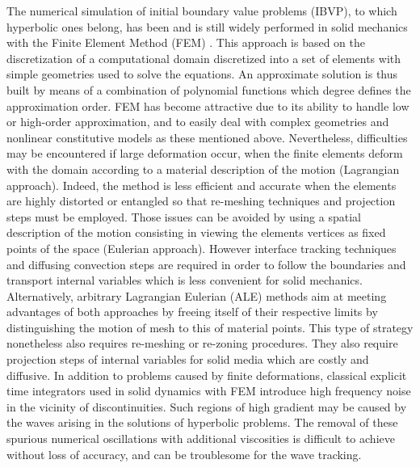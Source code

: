 The numerical simulation of initial boundary value problems (IBVP), to which hyperbolic ones belong, has been and is still widely performed in solid mechanics with the Finite Element Method (FEM) \cite{Belytschko}.
This approach is based on the discretization of a computational domain discretized into a set of elements with simple geometries used to solve the equations.
An approximate solution is thus built by means of a combination of polynomial functions which degree defines the approximation order.
FEM has become attractive due to its ability to handle low or high-order approximation, and to easily deal with complex geometries and nonlinear constitutive models as these mentioned above.  %
Nevertheless, difficulties may be encountered if large deformation occur, when the finite elements deform with the domain according to a material description of the motion (Lagrangian approach).
Indeed, the method is less efficient and accurate when the elements are highly distorted or entangled so that re-meshing techniques and projection steps must be employed.
Those issues can be avoided by using a spatial description of the motion consisting in viewing the elements vertices as fixed points of the space (Eulerian approach).
However interface tracking techniques and diffusing convection steps are required in order to follow the boundaries and transport internal variables which is less convenient for solid mechanics.
Alternatively, arbitrary Lagrangian Eulerian (ALE) methods aim at meeting advantages of both approaches by freeing itself of their respective limits by distinguishing the motion of mesh to this of material points.
This type of strategy nonetheless also requires re-meshing or re-zoning procedures. %
They also require projection steps of internal variables for solid media which are costly and diffusive.
In addition to problems caused by finite deformations, classical explicit time integrators used in solid dynamics with FEM introduce high frequency noise in the vicinity of discontinuities.
Such regions of high gradient may be caused by the waves arising in the solutions of hyperbolic problems.
The removal of these spurious numerical oscillations with additional viscosities is difficult to achieve without loss of accuracy, and can be troublesome for the wave tracking.


